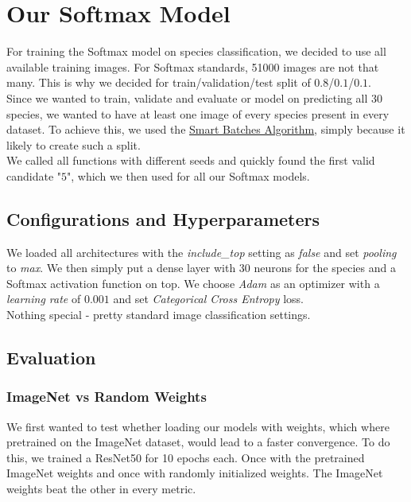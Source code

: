\section{Our Softmax Model}
\label{sec:softmax-model}

For training the Softmax model on species classification, we decided to use all available training images. For Softmax standards, 51000 images are not that many. This is why we decided for train/validation/test split of $0.8$/$0.1$/$0.1$. \\
Since we wanted to train, validate and evaluate or model on predicting all 30 species, we wanted to have at least one image of every species present in every dataset. To achieve this, we used the \hyperref[subsubsec:smart-batches]{Smart Batches Algorithm}, simply because it likely to create such a split. \\
We called all functions with different seeds and quickly found the first valid candidate "$5$", which we then used for all our Softmax models.

\subsection{Configurations and Hyperparameters}
We loaded all architectures with the \textit{include\_top} setting as \textit{false} and set \textit{pooling} to \textit{max}. We then simply put a dense layer with 30 neurons for the species and a Softmax activation function on top. We choose \textit{Adam} as an optimizer with a \textit{learning rate} of $0.001$ and set \textit{Categorical Cross Entropy} loss. \\
Nothing special - pretty standard image classification settings.

\subsection{Evaluation}
\subsubsection{ImageNet vs Random Weights}
We first wanted to test whether loading our models with weights, which where pretrained on the ImageNet dataset, would lead to a faster convergence. To do this, we trained a ResNet50 for 10 epochs each. Once with the pretrained ImageNet weights and once with randomly initialized weights. The ImageNet weights beat the other in every metric. \\

